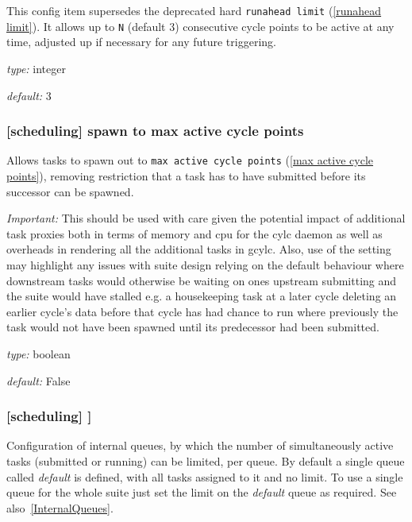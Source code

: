 This config item supersedes the deprecated hard \lstinline=runahead limit=
(\ref{runahead limit}). It allows up to \lstinline=N= (default 3) consecutive
cycle points to be active at any time, adjusted up if necessary for
any future triggering.

\begin{myitemize}
    \item {\em type:} integer
    \item {\em default:} 3
\end{myitemize}

\subsubsection[spawn to max active cycle points]{[scheduling] \textrightarrow
 spawn to max active cycle points}
\label{spawn to max active cycle points}

Allows tasks to spawn out to \lstinline=max active cycle points=
(\ref{max active cycle points}), removing restriction that a task has to have
submitted before its successor can be spawned.

{\em Important:} This should be used with care given the potential impact of
additional task proxies both in terms of memory and cpu for the cylc daemon as
well as overheads in rendering all the additional tasks in gcylc. Also, use
of the setting may highlight any issues with suite design relying on the
default behaviour where downstream tasks would otherwise be waiting on ones
upstream submitting and the suite would have stalled e.g. a housekeeping task
at a later cycle deleting an earlier cycle's data before that cycle has had
chance to run where previously the task would not have been spawned until its
predecessor had been submitted.

\begin{myitemize}
    \item {\em type:} boolean
    \item {\em default:} False
\end{myitemize}

\subsubsection[{[[}queues{]]}]{[scheduling] \textrightarrow [[queues]]}

Configuration of internal queues, by which the number of simultaneously
active tasks (submitted or running) can be limited, per queue. By
default a single queue called {\em default} is defined, with all tasks
assigned to it and no limit. To use a single queue for the whole suite
just set the limit on the {\em default} queue as required.
See also~\ref{InternalQueues}.

